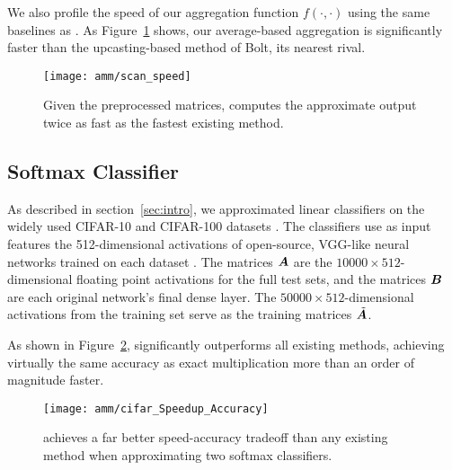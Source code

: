 We also profile the speed of our aggregation function $f(\cdot, \cdot)$ using the same baselines as \citet{bolt}. As Figure~\ref{fig:scanSpeed} shows, our average-based aggregation is significantly faster than the upcasting-based method of Bolt, its nearest rival.

\begin{figure}[h]
\begin{center}
\texttt{[image: amm/scan\_speed]}
\caption{Given the preprocessed matrices, \oursp computes the approximate output twice as fast as the fastest existing method.}
\label{fig:scanSpeed}
\end{center}
\end{figure}

\subsection{Softmax Classifier}

As described in section~\ref{sec:intro}, we approximated linear classifiers on the widely used CIFAR-10 and CIFAR-100 datasets \cite{cifarDsets}. The classifiers use as input features the 512-dimensional activations of open-source, VGG-like neural networks trained on each dataset \cite{cifarVgg}. The matrices $\bm{A}$ are the $10000 \times 512$-dimensional floating point activations for the full test sets, and the matrices $\bm{B}$ are each original network's final dense layer. The $50000 \times 512$-dimensional activations from the training set serve as the training matrices $\tilde{\bm{A}}$.

As shown in Figure~\ref{fig:cifar}, \oursp significantly outperforms all existing methods, achieving virtually the same accuracy as exact multiplication more than an order of magnitude faster.

\begin{figure}[h]
\begin{center}
\texttt{[image: amm/cifar\_Speedup\_Accuracy]}
\caption{\oursp achieves a far better speed-accuracy tradeoff than any existing method when approximating two softmax classifiers.}
\label{fig:cifar}
\end{center}
\end{figure}


